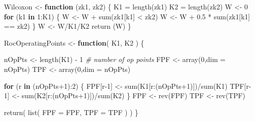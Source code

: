 \documentclass[
]{book}
\newenvironment{Shaded}{\begin{snugshade}}{\end{snugshade}}
\newcommand{\AttributeTok}[1]{\textcolor[rgb]{0.77,0.63,0.00}{#1}}
\newcommand{\CommentTok}[1]{\textcolor[rgb]{0.56,0.35,0.01}{\textit{#1}}}
\newcommand{\ControlFlowTok}[1]{\textcolor[rgb]{0.13,0.29,0.53}{\textbf{#1}}}
\newcommand{\DecValTok}[1]{\textcolor[rgb]{0.00,0.00,0.81}{#1}}
\newcommand{\FloatTok}[1]{\textcolor[rgb]{0.00,0.00,0.81}{#1}}
\newcommand{\FunctionTok}[1]{\textcolor[rgb]{0.00,0.00,0.00}{#1}}
\newcommand{\NormalTok}[1]{#1}
\newcommand{\OtherTok}[1]{\textcolor[rgb]{0.56,0.35,0.01}{#1}}
\newcommand{\SpecialCharTok}[1]{\textcolor[rgb]{0.00,0.00,0.00}{#1}}
\begin{document}
\begin{Shaded}
\begin{Highlighting}[]
\NormalTok{Wilcoxon }\OtherTok{\textless{}{-}} \ControlFlowTok{function}\NormalTok{ (zk1, zk2)}
\NormalTok{\{}
\NormalTok{  K1 }\OtherTok{=} \FunctionTok{length}\NormalTok{(zk1)}
\NormalTok{  K2 }\OtherTok{=} \FunctionTok{length}\NormalTok{(zk2)}
\NormalTok{  W }\OtherTok{\textless{}{-}} \DecValTok{0}
  \ControlFlowTok{for}\NormalTok{ (k1 }\ControlFlowTok{in} \DecValTok{1}\SpecialCharTok{:}\NormalTok{K1) \{}
\NormalTok{    W }\OtherTok{\textless{}{-}}\NormalTok{ W }\SpecialCharTok{+} \FunctionTok{sum}\NormalTok{(zk1[k1] }\SpecialCharTok{\textless{}}\NormalTok{ zk2)}
\NormalTok{    W }\OtherTok{\textless{}{-}}\NormalTok{ W }\SpecialCharTok{+} \FloatTok{0.5} \SpecialCharTok{*} \FunctionTok{sum}\NormalTok{(zk1[k1] }\SpecialCharTok{==}\NormalTok{ zk2)}
\NormalTok{  \}}
\NormalTok{  W }\OtherTok{\textless{}{-}}\NormalTok{ W}\SpecialCharTok{/}\NormalTok{K1}\SpecialCharTok{/}\NormalTok{K2}
  \FunctionTok{return}\NormalTok{ (W)}
\NormalTok{\}}

\NormalTok{RocOperatingPoints }\OtherTok{\textless{}{-}} \ControlFlowTok{function}\NormalTok{( K1, K2 ) \{}
  
\NormalTok{  nOpPts }\OtherTok{\textless{}{-}} \FunctionTok{length}\NormalTok{(K1) }\SpecialCharTok{{-}} \DecValTok{1} \CommentTok{\# number of op points}
\NormalTok{  FPF }\OtherTok{\textless{}{-}} \FunctionTok{array}\NormalTok{(}\DecValTok{0}\NormalTok{,}\AttributeTok{dim =}\NormalTok{ nOpPts)}
\NormalTok{  TPF }\OtherTok{\textless{}{-}} \FunctionTok{array}\NormalTok{(}\DecValTok{0}\NormalTok{,}\AttributeTok{dim =}\NormalTok{ nOpPts)}
   
  \ControlFlowTok{for}\NormalTok{ (r }\ControlFlowTok{in}\NormalTok{ (nOpPts}\SpecialCharTok{+}\DecValTok{1}\NormalTok{)}\SpecialCharTok{:}\DecValTok{2}\NormalTok{) \{}
\NormalTok{    FPF[r}\DecValTok{{-}1}\NormalTok{] }\OtherTok{\textless{}{-}} \FunctionTok{sum}\NormalTok{(K1[r}\SpecialCharTok{:}\NormalTok{(nOpPts}\SpecialCharTok{+}\DecValTok{1}\NormalTok{)])}\SpecialCharTok{/}\FunctionTok{sum}\NormalTok{(K1)}
\NormalTok{    TPF[r}\DecValTok{{-}1}\NormalTok{] }\OtherTok{\textless{}{-}} \FunctionTok{sum}\NormalTok{(K2[r}\SpecialCharTok{:}\NormalTok{(nOpPts}\SpecialCharTok{+}\DecValTok{1}\NormalTok{)])}\SpecialCharTok{/}\FunctionTok{sum}\NormalTok{(K2)    }
\NormalTok{  \}}
\NormalTok{  FPF }\OtherTok{\textless{}{-}} \FunctionTok{rev}\NormalTok{(FPF)}
\NormalTok{  TPF }\OtherTok{\textless{}{-}} \FunctionTok{rev}\NormalTok{(TPF)}
  
  \FunctionTok{return}\NormalTok{( }\FunctionTok{list}\NormalTok{(}
    \AttributeTok{FPF =}\NormalTok{ FPF,}
    \AttributeTok{TPF =}\NormalTok{ TPF}
\NormalTok{  ) )}
\NormalTok{\}}
\end{Highlighting}
\end{Shaded}
\end{document}

